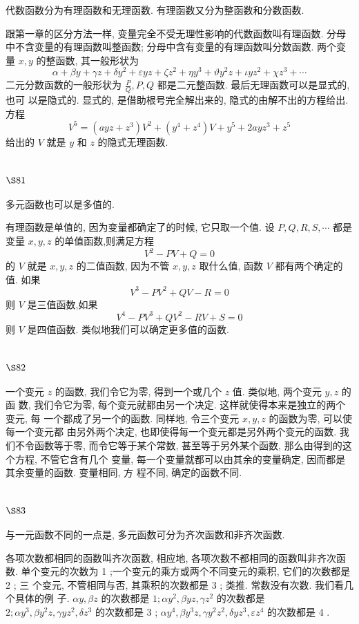 代数函数分为有理函数和无理函数. 有理函数又分为整函数和分数函数.

跟第一章的区分方法一样, 变量完全不受无理性影响的代数函数叫有理函数. 分母 中不含变量的有理函数叫整函数; 分母中含有变量的有理函数叫分数函数. 两个变量 $x, y$ 的整函数, 其一般形状为
\[
\alpha+\beta y+\gamma z+\delta y^{2}+\varepsilon y z+\zeta z^{2}+\eta y^{3}+\vartheta y^{2} z+\iota y z^{2}+\chi z^{3}+\cdots
\]
二元分数函数的一般形状为 $\frac{P}{Q}, P, Q$ 都是二元整函数. 最后无理函数可以是显式的, 也可 以是隐式的. 显式的, 是借助根号完全解出来的, 隐式的由解不出的方程给出. 方程
\[
V^{5}=\left(a y z+z^{3}\right) V^{2}+\left(y^{4}+z^{4}\right) V+y^{5}+2 a y z^{3}+z^{5}
\]
给出的 $V$ 就是 $y$ 和 $z$ 的隐式无理函数.

\section{$\S 81$}

多元函数也可以是多值的.

有理函数是单值的, 因为变量都确定了的时候, 它只取一个值. 设 $P, Q, R, S, \cdots$ 都是 变量 $x, y, z$ 的单值函数,则满足方程
\[
V^{2}-P V+Q=0
\]
的 $V$ 就是 $x, y, z$ 的二值函数, 因为不管 $x, y, z$ 取什么值, 函数 $V$ 都有两个确定的值. 如果
\[
V^{3}-P V^{2}+Q V-R=0
\]
则 $V$ 是三值函数,如果
\[
V^{4}-P V^{3}+Q V^{2}-R V+S=0
\]
则 $V$ 是四值函数. 类似地我们可以确定更多值的函数.

\section{$\S 82$}

一个变元 $z$ 的函数, 我们令它为零, 得到一个或几个 $z$ 值. 类似地, 两个变元 $y, z$ 的函 数, 我们令它为零, 每个变元就都由另一个决定. 这样就使得本来是独立的两个变元, 每 一个都成了另一个的函数. 同样地, 令三个变元 $x, y, z$ 的函数为零, 可以使每一个变元都 由另外两个决定, 也即使得每一个变元都是另外两个变元的函数. 我们不令函数等于零, 而令它等于某个常数, 甚至等于另外某个函数, 那么由得到的这个方程, 不管它含有几个 变量, 每一个变量就都可以由其余的变量确定, 因而都是其余变量的函数. 变量相同, 方 程不同, 确定的函数不同. 

\section{$\S 83$}

与一元函数不同的一点是, 多元函数可分为齐次函数和非齐次函数.

各项次数都相同的函数叫齐次函数, 相应地, 各项次数不都相同的函数叫非齐次函 数. 单个变元的次数为 1 ;一个变元的乘方或两个不同变元的乘积, 它们的次数都是 2 ; 三 个变元, 不管相同与否, 其乘积的次数都是 3 ; 类推. 常数没有次数. 我们看几个具体的例 子. $\alpha y, \beta z$ 的次数都是 $1 ; \alpha y^{2}, \beta y z, \gamma z^{2}$ 的次数都是 $2 ; \alpha y^{3}, \beta y^{2} z, \gamma y z^{2}, \delta z^{3}$ 的次数都是 3 ; $\alpha y^{4}, \beta y^{3} z, \gamma y^{2} z^{2}, \delta y z^{3}, \varepsilon z^{4}$ 的次数都是 4 .

